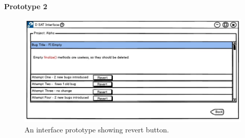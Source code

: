 \clearpage

\textbf{Prototype 2}
\begin{figure}[hbt!]
	\centering
	\includegraphics[width=\linewidth]{figures/d_revert}
	\caption{An interface prototype showing revert button.}
	\label{fig:d_revert}
\end{figure}

\let\cleardoublepage\clearpage


	
